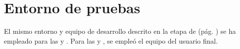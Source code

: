 \section{\forlnameref Entorno de pruebas}
\label{sec:testsEnvironment}

El mismo entorno y equipo de desarrollo descrito en la etapa de  (pág. \pageref{sec:resources}) se ha empleado para las  y . Para las  y , se empleó el equipo del usuario final.